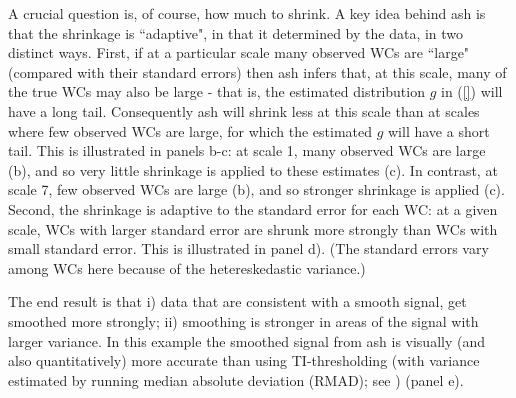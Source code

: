 \documentclass[12pt]{article}
\begin{document}
A crucial question is, of course, how much to shrink. A key idea behind ash is that the shrinkage is ``adaptive", in that it
determined by the data, in two distinct ways. First, if at a particular scale many observed WCs are ``large" (compared with their standard errors)
then ash infers that, at this scale, many of the true WCs may also be large - that is, the estimated distribution $g$ in (\ref{}) will have a long tail.
Consequently ash will shrink less at this scale than at scales where few observed
WCs are large, for which the estimated $g$ will have a short tail. This is illustrated in panels b-c: at scale 1, many observed WCs are large (b), and so very little shrinkage is applied to these estimates (c).
In contrast, at scale 7, few observed WCs are large (b), and so stronger shrinkage is applied (c). Second, the shrinkage is adaptive to 
the standard error for each WC: at a given scale, WCs with larger standard error are shrunk more strongly than WCs with small standard error.
This is illustrated in panel d). (The standard errors vary among WCs here because of the hetereskedastic variance.)

 The end result is that i) data that are consistent with a smooth signal, get smoothed more strongly; ii) smoothing is stronger in areas
 of the signal with larger variance. In this example the smoothed signal from ash is visually (and also quantitatively) more accurate than
 using TI-thresholding (with variance estimated by running median absolute deviation (RMAD); see \cite{Gao1997Wavelet}) (panel e).
\end{document}
